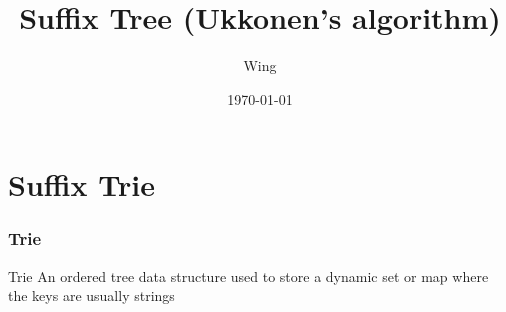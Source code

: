\documentclass[compress]{beamer}
\author{Wing}
\title{Suffix Tree (Ukkonen's algorithm)}
\begin{document}
\date{\today} 

\frame[plain]{\titlepage} %


\section{Suffix Trie}
\begin{frame} \frametitle{Trie}
\begin{block}{Trie}
    An ordered tree data structure used to store a dynamic set or map where the keys are usually strings
\end{block}
\end{frame}
\end{document}
